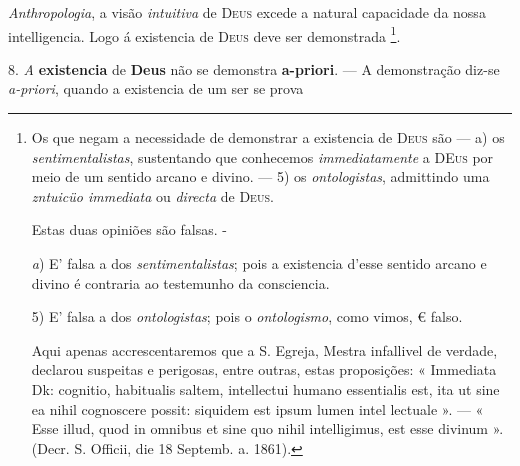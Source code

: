  \emph{Anthropologia}, a visão \emph{intuitiva} de \textsc{Deus} excede a natural capacidade da nossa intelligencia. Logo á existencia de \textsc{Deus} deve ser demonstrada \footnote{Os que negam a necessidade de demonstrar a existencia de \textsc{Deus} são --- a) os \emph{sentimentalistas}, sustentando que conhecemos \emph{immediatamente} a \textsc{DEus} por meio de um sentido arcano e divino. --- 5) os \emph{ontologistas}, admittindo uma \emph{zntuicüo immediata} ou \emph{directa} de \textsc{Deus}.\par Estas duas opiniões são falsas. -\par \emph{a}) E' falsa a dos \emph{sentimentalistas}; pois a existencia d'esse sentido arcano e divino é contraria ao testemunho da consciencia.\par 5) E' falsa a dos \emph{ontologistas}; pois o \emph{ontologismo}, como vimos, € falso.\par Aqui apenas accrescentaremos que a S. Egreja, Mestra infallivel de verdade, declarou suspeitas e perigosas, entre outras, estas proposições: « Immediata Dk: cognitio, habitualis saltem, intellectui humano essentialis est, ita ut sine ea nihil cognoscere possit: siquidem est ipsum lumen intel lectuale ». --- « Esse illud, quod in omnibus et sine quo nihil intelligimus, est esse divinum ». (Decr. S. Officii, die 18 Septemb. a. 1861).}.

8. \emph{A} \textbf{existencia} de \textbf{Deus} não se demonstra \textbf{a-priori}. --- A demonstração diz-se \emph{a-priori}, quando a existencia de um ser se prova 